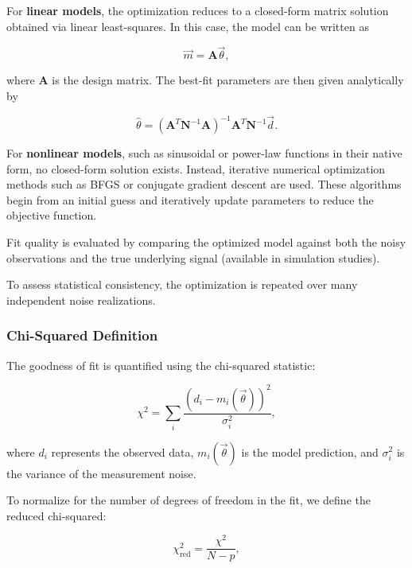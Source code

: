 \documentclass{article}
\begin{document}
For \textbf{linear models}, the optimization reduces to a closed-form matrix solution obtained via linear least-squares. In this case, the model can be written as

\begin{equation}
\vec{m} = \mathbf{A}\vec{\theta},
\end{equation}

where $\mathbf{A}$ is the design matrix. The best-fit parameters are then given analytically by

\begin{equation}
\hat{\theta} = (\mathbf{A}^T \mathbf{N}^{-1} \mathbf{A})^{-1} \mathbf{A}^T \mathbf{N}^{-1} \vec{d}.
\end{equation}

For \textbf{nonlinear models}, such as sinusoidal or power-law functions in their native form, no closed-form solution exists. Instead, iterative numerical optimization methods such as BFGS or conjugate gradient descent are used. These algorithms begin from an initial guess and iteratively update parameters to reduce the objective function.

Fit quality is evaluated by comparing the optimized model against both the noisy observations and the true underlying signal (available in simulation studies).

To assess statistical consistency, the optimization is repeated over many independent noise realizations.

\subsubsection{Chi-Squared Definition}

The goodness of fit is quantified using the chi-squared statistic:

\begin{equation}
\chi^2 = \sum_i \frac{(d_i - m_i(\vec{\theta}))^2}{\sigma_i^2},
\end{equation}

where $d_i$ represents the observed data, $m_i(\vec{\theta})$ is the model prediction, and $\sigma_i^2$ is the variance of the measurement noise.

To normalize for the number of degrees of freedom in the fit, we define the reduced chi-squared:

\begin{equation}
\chi^2_{\mathrm{red}} = \frac{\chi^2}{N - p},
\end{equation}
\end{document}
